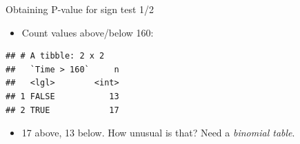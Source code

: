 \documentclass[
  ignorenonframetext,
]{beamer}
\newenvironment{Shaded}{\begin{snugshade}}{\end{snugshade}}
\newcommand{\DecValTok}[1]{\textcolor[rgb]{0.00,0.00,0.81}{#1}}
\newcommand{\KeywordTok}[1]{\textcolor[rgb]{0.13,0.29,0.53}{\textbf{#1}}}
\newcommand{\NormalTok}[1]{#1}
\newcommand{\OperatorTok}[1]{\textcolor[rgb]{0.81,0.36,0.00}{\textbf{#1}}}
\newcommand{\StringTok}[1]{\textcolor[rgb]{0.31,0.60,0.02}{#1}}
\providecommand{\tightlist}{%
  \setlength{\itemsep}{0pt}\setlength{\parskip}{0pt}}
\begin{document}
\begin{frame}[fragile]{Obtaining P-value for sign test 1/2}
\protect\hypertarget{obtaining-p-value-for-sign-test-12}{}

\begin{itemize}
\tightlist
\item
  Count values above/below 160:
\end{itemize}

\begin{Shaded}
\end{Shaded}

\begin{verbatim}
## # A tibble: 2 x 2
##   `Time > 160`     n
##   <lgl>        <int>
## 1 FALSE           13
## 2 TRUE            17
\end{verbatim}

\begin{itemize}
\tightlist
\item
  17 above, 13 below. How unusual is that? Need a \emph{binomial table}.
\end{itemize}

\end{frame}
\end{document}
